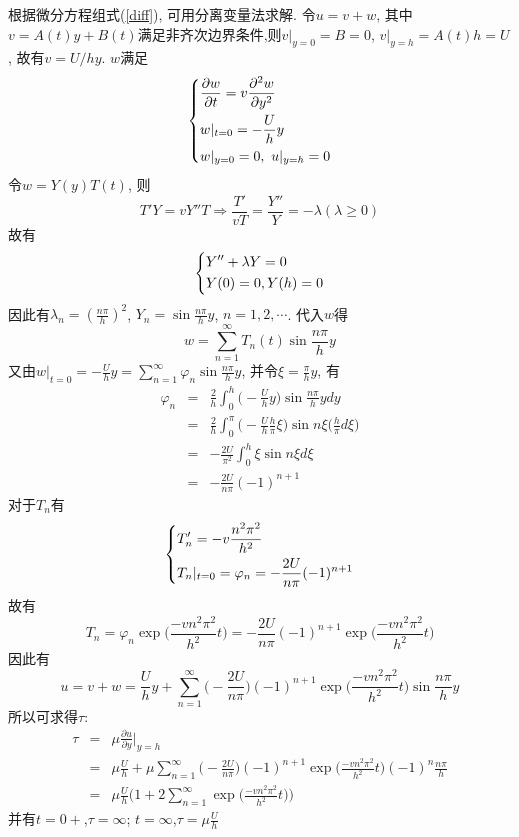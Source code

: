 \begin{solution}
根据微分方程组式(\ref{diff}), 可用分离变量法求解. 令$u=v+w$, 其中$v=A(t)y + B(t)$满足非齐次边界条件,则$v|_{y=0} = B = 0$, $v|_{y=h} = A(t)h = U$, 故有$v=U/h y$. $w$满足
\[
\begin{dcases}
\frac{\partial w}{\partial t} = v \frac{\partial ^2 w}{\partial y^2} \\
w|_{t=0} = -\frac{U}{h}y\\
w|_{y=0} = 0, {~}u|_{y=h} = 0
\end{dcases}
\]
令$w=Y(y)T(t)$, 则
\[
T' Y = v Y''T \Longrightarrow  \frac{T'}{vT} = \frac{Y''}{Y} = -\lambda(\lambda\geq 0)
\]
故有
\[
\begin{dcases}
Y'' + \lambda Y = 0 \\
Y(0) = 0, Y(h) = 0
\end{dcases}
\]
因此有$\lambda_n = (\frac{n\pi}{h})^2$, $Y_n = \sin\frac{n\pi}{h}y$, $n=1, 2,\cdots$. 代入$w$得
\[
w = \sum_{n=1}^{\infty}T_n(t)\sin\frac{n\pi}{h}y
\]
又由$w|_{t=0} = -\frac{U}{h}y = \sum_{n=1}^\infty\varphi_n\sin\frac{n\pi}{h}y$, 并令$\xi=\frac{\pi}{h}y$, 有
{\setlength\arraycolsep{2pt}
\begin{eqnarray}
\varphi_n & = & \frac{2}{h}\int_0^h\Big(-\frac{U}{h}y\Big)\sin\frac{n\pi}{h}y dy
\nonumber\\
& = & \frac{2}{h}\int_0^\pi\Big(-\frac{U}{h}\frac{h}{\pi}\xi\Big)\sin n\xi\Big(\frac{h}{\pi} d\xi\Big)
\nonumber\\
& = & -\frac{2U}{\pi^2}\int_0^h\xi\sin n\xi d\xi\nonumber\\
& = & - \frac{2U}{n\pi}(-1)^{n+1}\nonumber
\end{eqnarray}}
对于$T_n$有
\[
\begin{dcases}
T_n' = - v\frac{n^2\pi^2}{h^2} \\
T_n|_{t=0} = \varphi_n = -\frac{2U}{n\pi}(-1)^{n+1}
\end{dcases}
\]
故有
\[
T_n = \varphi_n\exp\Big(\frac{-vn^2\pi^2}{h^2}t\Big) = -\frac{2U}{n\pi}(-1)^{n+1}\exp\Big(\frac{-vn^2\pi^2}{h^2}t\Big)
\]
因此有
\[
u = v + w = \frac{U}{h}y + \sum_{n=1}^\infty\Big(-\frac{2U}{n\pi}\Big)(-1)^{n+1}\exp\Big(\frac{-vn^2\pi^2}{h^2}t\Big)\sin\frac{n\pi}{h}y
\]
所以可求得$\tau$:
{\setlength\arraycolsep{2pt}
\begin{eqnarray}
\tau & = & \mu\frac{\partial u}{\partial y}\Big|_{y=h}
\nonumber\\
& = & \mu\frac{U}{h} + \mu\sum_{n=1}^\infty\Big(-\frac{2U}{n\pi}\Big)(-1)^{n+1}\exp\Big(\frac{-vn^2\pi^2}{h^2}t\Big)(-1)^n\frac{n\pi}{h}
\nonumber\\
& = & \mu\frac{U}{h}\Big(1+2\sum_{n=1}^\infty\exp\big(\frac{-vn^2\pi^2}{h^2}t\big)\Big)\nonumber
\end{eqnarray}}
并有$t=0+$,$\tau = \infty$; $t=\infty$,$\tau = \mu \frac{U}{h}$
\end{solution}
